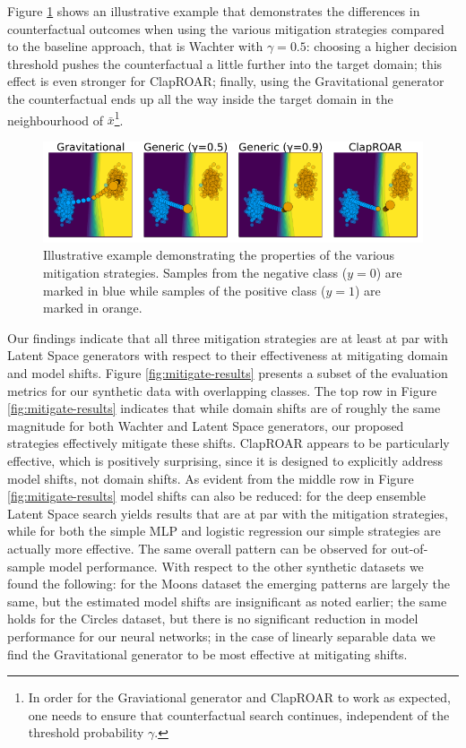 \documentclass[conference,final,]{IEEEtran}
\theoremstyle{definition}
\theoremstyle{definition}
\theoremstyle{definition}
\theoremstyle{definition}
\theoremstyle{remark}
\begin{document}
Figure \ref{fig:mitigation} shows an illustrative example that demonstrates the differences in counterfactual outcomes when using the various mitigation strategies compared to the baseline approach, that is Wachter with \(\gamma=0.5\): choosing a higher decision threshold pushes the counterfactual a little further into the target domain; this effect is even stronger for ClapROAR; finally, using the Gravitational generator the counterfactual ends up all the way inside the target domain in the neighbourhood of \(\bar{x}\)\footnote{In order for the Graviational generator and ClapROAR to work as expected, one needs to ensure that counterfactual search continues, independent of the threshold probability \(\gamma\).}.

\begin{figure}

{\centering \includegraphics[width=0.9\linewidth]{www/mitigation} 

}

\caption{Illustrative example demonstrating the properties of the various mitigation strategies. Samples from the negative class ($y=0$) are marked in blue while samples of the positive class ($y=1$) are marked in orange.}\label{fig:mitigation}
\end{figure}

Our findings indicate that all three mitigation strategies are at least at par with Latent Space generators with respect to their effectiveness at mitigating domain and model shifts. Figure \ref{fig:mitigate-results} presents a subset of the evaluation metrics for our synthetic data with overlapping classes. The top row in Figure \ref{fig:mitigate-results} indicates that while domain shifts are of roughly the same magnitude for both Wachter and Latent Space generators, our proposed strategies effectively mitigate these shifts. ClapROAR appears to be particularly effective, which is positively surprising, since it is designed to explicitly address model shifts, not domain shifts. As evident from the middle row in Figure \ref{fig:mitigate-results} model shifts can also be reduced: for the deep ensemble Latent Space search yields results that are at par with the mitigation strategies, while for both the simple MLP and logistic regression our simple strategies are actually more effective. The same overall pattern can be observed for out-of-sample model performance. With respect to the other synthetic datasets we found the following: for the Moons dataset the emerging patterns are largely the same, but the estimated model shifts are insignificant as noted earlier; the same holds for the Circles dataset, but there is no significant reduction in model performance for our neural networks; in the case of linearly separable data we find the Gravitational generator to be most effective at mitigating shifts.
\end{document}
